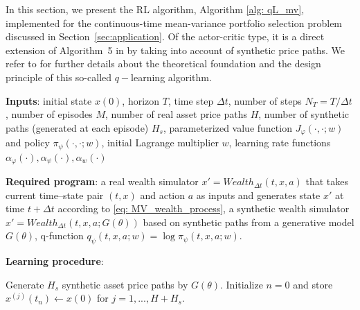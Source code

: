 \documentclass[11pt]{article}
\begin{document}
In this section, we present the RL algorithm, Algorithm \ref{alg: qL_mv}, implemented for the continuous-time mean-variance portfolio selection problem discussed in Section~\ref{sec:application}. Of the actor-critic type, it is a direct extension of Algorithm~5 in \cite{jia2023q} by taking into account of synthetic price paths. We refer to \cite{jia2023q} for further details about the theoretical foundation and the design principle of this so-called $q-$learning algorithm.



\begin{algorithm}[htbp]
\caption{Offline q-Learning Mean–Variance Algorithm with Synthetic Wealth Simulator}
\textbf{Inputs}: initial state $x(0)$, horizon $T$, time step $\Delta t$, number of steps $N_T = T/\Delta t$, number of episodes $M$, number of real asset price paths $H$, number of synthetic paths (generated at each episode) $H_s$, parameterized value function $J_{\varphi}(\cdot,\cdot; w)$ and policy $\pi_{\psi}(\cdot,\cdot; w)$, initial Lagrange multiplier $w$, learning rate functions $\alpha_{\varphi}(\cdot),\alpha_{\psi}(\cdot), \alpha_w(\cdot)$

\textbf{Required program}: a real wealth simulator $x' = Wealth_{\Delta t}(t,x,a)$ that takes current time--state pair $(t,x)$ and action $a$ as inputs and generates state $x'$ at time $t + \Delta t$ according to \eqref{eq: MV_wealth_process}, a synthetic wealth simulator $x'=Wealth_{\Delta t}(t, x, a; G(\theta))$ based on synthetic paths from a generative model $G(\theta)$, q-function $q_{\psi}(t, x, a; w) = \log\pi_\psi(t, x, a; w)$.


\textbf{Learning procedure}:
\begin{algorithmic}
\STATE Generate $H_s$ synthetic asset price paths by $G(\theta)$.
\STATE Initialize $n = 0$ and store $x^{(j)}(t_n) \leftarrow  x(0)$ for $j=1,..., H + H_s$.

\end{algorithmic}
\end{algorithm}
\end{document}
